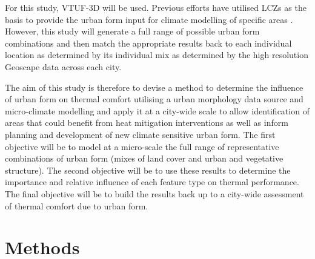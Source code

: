 \documentclass[final,3p,times,authoryear]{elsarticle}
\begin{document}
For this study, VTUF-3D will be used. Previous efforts have utilised LCZs as the basis to provide the urban form input for climate modelling of specific areas \citep{stewart2014eval,Verdonck2018,Hammerberg2018,Masson2020,Emery2021}. However, this study will generate a full range of possible urban form combinations and then match the appropriate results back to each individual location as determined by its individual mix as determined by the high resolution Geoscape data across each city. 

The aim of this study is therefore to devise a method to determine the influence of urban form on thermal comfort utilising a urban morphology data source and micro-climate modelling and apply it at a city-wide scale to allow identification of areas that could benefit from heat mitigation interventions as well as inform planning and development of new climate sensitive urban form. The first objective will be to model at a micro-scale the full range of representative combinations of urban form (mixes of land cover and urban and vegetative structure). The second objective will be to use these results to determine the importance and relative influence of each feature type on thermal performance. The final objective will be to build the results back up to a city-wide assessment of thermal comfort due to urban form.






\section{Methods}\label{sec:methods}
\end{document}
